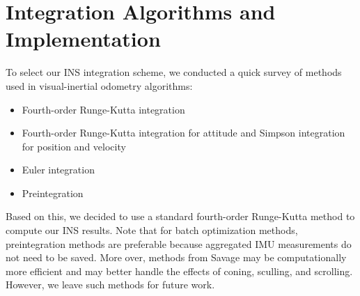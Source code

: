 \documentclass[11pt,a4paper]{article}
\begin{document}
\section{Integration Algorithms and Implementation}

To select our INS integration scheme, we conducted a quick survey of methods used in visual-inertial odometry algorithms:
\begin{itemize}
	\item Fourth-order Runge-Kutta integration \cite{Mirzaei:2008,Hesch:2014,Keivan:2015,Kelly:2011}
	\item Fourth-order Runge-Kutta integration for attitude and Simpson integration for position and velocity \cite{Li:2013}
	\item Euler integration \cite{Jones:2011}
	\item Preintegration \cite{Artal:2017}
\end{itemize}
Based on this, we decided to use a standard fourth-order Runge-Kutta method to compute our INS results. Note that for batch optimization methods, preintegration methods are preferable because aggregated IMU measurements do not need to be saved. More over, methods from Savage \cite{SavageP1:2007,SavageP2:2007} may be computationally more efficient and may better handle the effects of coning, sculling, and scrolling. However, we leave such methods for future work.
\end{document}
